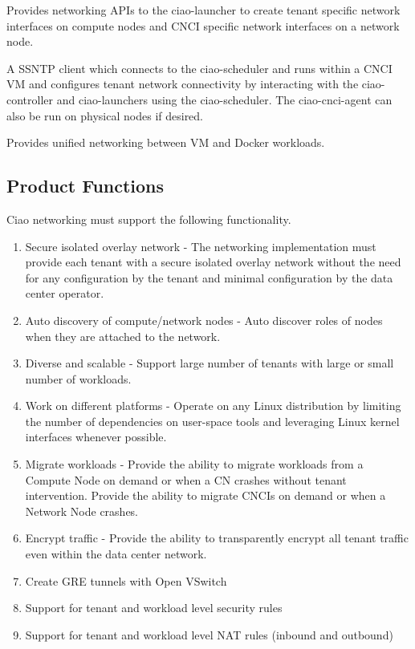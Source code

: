 \documentclass[10pt,letterpaper,onecolumn,draftclsnofoot]{IEEEtran}
\begin{document}
\begin{description}[leftmargin=12em,style=nextline]
	\item[libsnnet]
		Provides networking APIs to the ciao-launcher to create tenant
		specific network interfaces on compute nodes and CNCI specific
		network interfaces on a network node.
	\item[ciao-cnci-agent]
		A SSNTP client which connects to the ciao-scheduler and runs
		within a CNCI VM and configures tenant network connectivity by
		interacting with the ciao-controller and ciao-launchers using
		the ciao-scheduler. The ciao-cnci-agent can also be run on
		physical nodes if desired.
	\item[docker-plugin]
		Provides unified networking between VM and Docker workloads.
\end{description}

\subsection{Product Functions}

Ciao networking must support the following functionality.

\begin{enumerate}
	\item Secure isolated overlay network - The networking implementation
		must provide each tenant with a secure isolated overlay network
		without the need for any configuration by the tenant and minimal
		configuration by the data center operator.
	\item Auto discovery of compute/network nodes - Auto discover roles of
		nodes when they are attached to the network.
	\item Diverse and scalable - Support large number of tenants with large
		or small number of workloads.
	\item Work on different platforms - Operate on any Linux distribution
		by limiting the number of dependencies on user-space tools and
		leveraging Linux kernel interfaces whenever possible.
	\item Migrate workloads - Provide the ability to migrate workloads from
		a Compute Node on demand or when a CN crashes without tenant
		intervention. Provide the ability to migrate CNCIs on demand or
		when a Network Node crashes.
	\item Encrypt traffic - Provide the ability to transparently encrypt all
		tenant traffic even within the data center network.
	\item Create GRE tunnels with Open VSwitch
	\item Support for tenant and workload level security rules
	\item Support for tenant and workload level NAT rules (inbound and outbound)
\end{enumerate}
\end{document}
